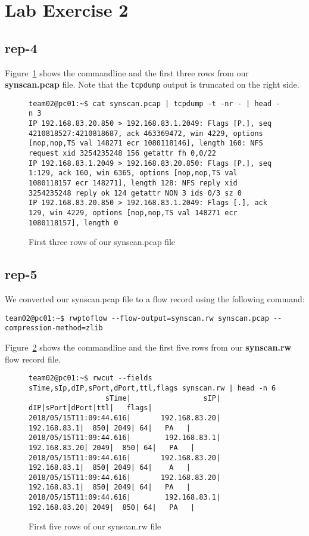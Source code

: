 \documentclass{article}
\begin{document}
\section{Lab Exercise 2}

\subsection{rep-4}

Figure~\ref{figure:command_3_rows} shows the commandline and the first three rows from
our \textbf{synscan.pcap} file. Note that the \texttt{tcpdump} output is truncated on the
right side.

\begin{figure}[h]
\begin{Verbatim}[fontsize=\small]
team02@pc01:~$ cat synscan.pcap | tcpdump -t -nr - | head -n 3
IP 192.168.83.20.850 > 192.168.83.1.2049: Flags [P.], seq 4210818527:4210818687, ack 463369472, win 4229, options [nop,nop,TS val 148271 ecr 1080118146], length 160: NFS request xid 3254235248 156 getattr fh 0,0/22
IP 192.168.83.1.2049 > 192.168.83.20.850: Flags [P.], seq 1:129, ack 160, win 6365, options [nop,nop,TS val 1080118157 ecr 148271], length 128: NFS reply xid 3254235248 reply ok 124 getattr NON 3 ids 0/3 sz 0
IP 192.168.83.20.850 > 192.168.83.1.2049: Flags [.], ack 129, win 4229, options [nop,nop,TS val 148271 ecr 1080118157], length 0
\end{Verbatim}
\caption{\label{figure:command_3_rows} First three rows of our synscan.pcap file}
\end{figure}

\subsection{rep-5}

We converted our synscan.pcap file to a flow record using the following command:

\begin{Verbatim}
team02@pc01:~$ rwptoflow --flow-output=synscan.rw synscan.pcap --compression-method=zlib
\end{Verbatim}

Figure~\ref{figure:command_5_rows} shows the commandline and the first five rows from our
\textbf{synscan.rw} flow record file.

\begin{figure}[h]
\begin{Verbatim}
team02@pc01:~$ rwcut --fields sTime,sIp,dIP,sPort,dPort,ttl,flags synscan.rw | head -n 6
                  sTime|                 sIP|                 dIP|sPort|dPort|ttl|   flags|
2018/05/15T11:09:44.616|       192.168.83.20|        192.168.83.1|  850| 2049| 64|   PA   |
2018/05/15T11:09:44.616|        192.168.83.1|       192.168.83.20| 2049|  850| 64|   PA   |
2018/05/15T11:09:44.616|       192.168.83.20|        192.168.83.1|  850| 2049| 64|    A   |
2018/05/15T11:09:44.616|       192.168.83.20|        192.168.83.1|  850| 2049| 64|   PA   |
2018/05/15T11:09:44.616|        192.168.83.1|       192.168.83.20| 2049|  850| 64|   PA   |
\end{Verbatim}
\caption{\label{figure:command_5_rows} First five rows of our synscan.rw file}
\end{figure}
\end{document}
